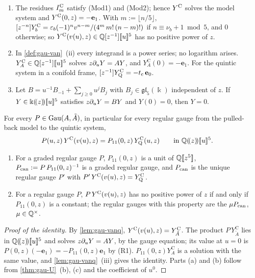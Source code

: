 \begin{lem}
\label{lem:gau-vanq}
\begin{enumerate}
\item The residues $I^{\mathrm{C}}_m$ satisfy (Mod1) and (Mod2); hence $Y^{\mathrm{C}}$ solves the model system and $Y^{\mathrm{C}}(0,z)=-\mathbf e_1$. With $m:=\lfloor n/5\rfloor$, $[z^{-n}]Y^{\mathrm{C}}_b=\varepsilon_b(-1)^nv^{n-m}/(4^m\,m!\,(n-m)!)$ if $n\equiv\nu_b+1\bmod5$, and $0$ otherwise; so $Y^{\mathrm{C}}(v(u),z)\in\mathbb{Q}[z^{-1}][\![ u ]\!]^5$ has no positive power of $z$.
\item In \cref{def:gau-van}~(ii) every integrand is a power series; no logarithm arises. $Y^{\mathrm C}_A\in\mathbb{Q}[z^{-1}][\![ u ]\!]^5$ solves $z\partial_uY=AY$, and $Y^{\mathrm C}_A(0)=-\mathbf e_1$. For the quintic system in a conifold frame, $[z^{-1}]Y^{\mathrm{C}}_{\mathrm{Q}}=-t_{\mathrm{c}}\,\mathbf e_0$.
\item Let $B=u^{-1}B_{-1}+\sum_{j\geq0}u^jB_j$ with $B_j\in\mathfrak{gl}_5(\Bbbk)$ independent of $z$. If $Y\in\Bbbk(\!(z)\!)[\![ u ]\!]^5$ satisfies $z\partial_uY=BY$ and $Y(0)=0$, then $Y=0$.
\end{enumerate}
\end{lem}

\begin{thm}
\label{thm:gau-G}
For every $P\in\operatorname{Gau}(A,\tilde A)$, in particular for every regular gauge from the pulled-back model to the quintic system,
\[
P(u,z)\,Y^{\mathrm{C}}(v(u),z)=P_{11}(0,z)\,Y^{\mathrm{C}}_{\mathrm{Q}}(u,z)\qquad\text{in }\mathbb{Q}(\!(z)\!)[\![ u ]\!]^5 .
\]
\begin{enumerate}
\item[(a)] For a graded regular gauge $P$, $P_{11}(0,z)$ is a unit of $\mathbb{Q}[\![ z^5 ]\!]$, $P_{\mathrm{can}}:=P\,P_{11}(0,z)^{-1}$ is a graded regular gauge, and $P_{\mathrm{can}}$ is the unique regular gauge $P'$ with $P'\,Y^{\mathrm{C}}(v(u),z)=Y^{\mathrm{C}}_{\mathrm{Q}}$.
\item[(b)] For a regular gauge $P$, $P\,Y^{\mathrm{C}}(v(u),z)$ has no positive power of $z$ if and only if $P_{11}(0,z)$ is a constant; the regular gauges with this property are the $\mu P_{\mathrm{can}}$, $\mu\in\mathbb{Q}^\times$.
\end{enumerate}
\end{thm}

\begin{proof}[Proof of the identity]
By \cref{lem:gau-vanq}, $Y^{\mathrm{C}}(v(u),z)=Y^{\mathrm C}_{\tilde A}$. The product $P\,Y^{\mathrm C}_{\tilde A}$ lies in $\mathbb{Q}(\!(z)\!)[\![ u ]\!]^5$ and solves $z\partial_uY=AY$, by the gauge equation; its value at $u=0$ is $P(0,z)(-\mathbf e_1)=-P_{11}(0,z)\mathbf e_1$ by (R1). $P_{11}(0,z)Y^{\mathrm C}_A$ is a solution with the same value, and \cref{lem:gau-vanq}~(iii) gives the identity. Parts (a) and (b) follow from \cref{thm:gau-U}~(b), (c) and the coefficient of $u^0$.
\end{proof}

